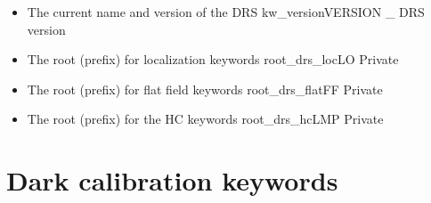 \begin{itemize}

\item {}
{The current name and version of the DRS}
{kw\_version}{VERSION}
{\_}
{DRS version}
{\AllRecipes}{\spirouKeywords}{\spirouKeywords}


\item {}
{The root (prefix) for localization keywords}
{root\_drs\_loc}{LO}
{\spirouKeywords}{\spirouKeywords}{\spirouKeywords}{Private}


\item {}
{The root (prefix) for flat field keywords}
{root\_drs\_flat}{FF}
{\spirouKeywords}{\spirouKeywords}{\spirouKeywords}{Private}

\item {}
{The root (prefix) for the HC keywords}
{root\_drs\_hc}{LMP}
{\spirouKeywords}{\spirouKeywords}{\spirouKeywords}{Private}

\end{itemize}

\clearpage
\newpage
\section{Dark calibration keywords}
\label{ch:output_keywords:dark}

